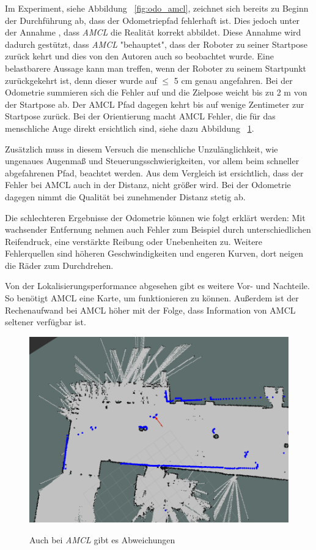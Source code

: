 \documentclass[11pt,a4paper]{article}
\begin{document}
{	Im Experiment, siehe Abbildung ~\ref{fig:odo_amcl}, zeichnet sich bereits zu Beginn der Durchf\"uhrung ab, dass der Odometriepfad fehlerhaft ist. Dies jedoch unter der Annahme , dass \textit{AMCL} die Realit\"at korrekt abbildet. Diese Annahme wird dadurch gest\"utzt, dass \textit{AMCL} "behauptet", dass der Roboter zu seiner Startpose zur\"uck kehrt und dies von den Autoren auch so beobachtet wurde.  
	Eine belastbarere Aussage kann man treffen, wenn der Roboter zu seinem Startpunkt zur\"uckgekehrt ist, denn dieser wurde auf $\leq$ 5 cm genau angefahren. Bei der Odometrie summieren sich die Fehler auf und die Zielpose weicht bis zu 2 m von der Startpose ab. 
	Der AMCL Pfad dagegen kehrt bis auf wenige Zentimeter zur Startpose zur\"uck. Bei der Orientierung macht AMCL Fehler, die f\"ur das menschliche Auge direkt ersichtlich sind, siehe dazu Abbildung ~\ref{fig:amclFails}.

	 Zus\"atzlich muss in diesem Versuch die menschliche Unzulänglichkeit, wie ungenaues Augenma{\ss} und Steuerungsschwierigkeiten, vor allem beim schneller abgefahrenen Pfad, beachtet werden. Aus dem Vergleich ist ersichtlich, dass der Fehler bei AMCL auch in der Distanz, nicht gr\"o{\ss}er wird.
	 Bei der Odometrie dagegen nimmt die Qualit\"at bei zunehmender Distanz stetig ab. 

	Die schlechteren Ergebnisse der Odometrie k\"onnen wie folgt erkl\"art werden: Mit wachsender Entfernung nehmen auch Fehler zum Beispiel durch unterschiedlichen Reifendruck, eine verst\"arkte Reibung oder Unebenheiten zu. Weitere Fehlerquellen sind h\"oheren Geschwindigkeiten und engeren Kurven, dort neigen die R\"ader zum Durchdrehen. 	



	Von der Lokalisierungsperformance abgesehen gibt es weitere Vor- und Nachteile. So ben\"otigt AMCL eine Karte, um funktionieren zu k\"onnen. Au{\ss}erdem ist der Rechenaufwand bei AMCL h\"oher mit der Folge, dass Information von AMCL seltener verf\"ugbar ist. 


\begin{figure}[h]
	\centering
	{\includegraphics[width=\linewidth]{pictures/amcl_fail.png}}
	\caption{ Auch bei \textit{AMCL} gibt es Abweichungen \label{fig:amclFails}}
\end{figure}





}
\end{document}
